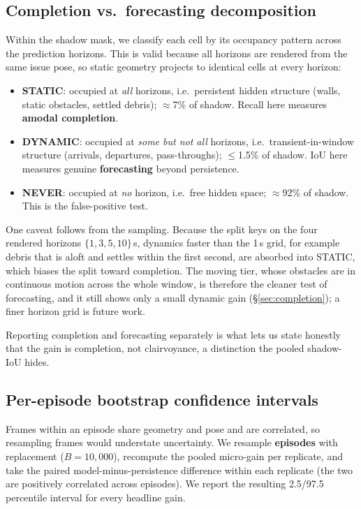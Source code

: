 \documentclass{article}
\begin{document}
\subsection{Completion vs.\ forecasting decomposition}
\label{sec:decomp}

Within the shadow mask, we classify each cell by its occupancy pattern across the prediction
horizons. This is valid because all horizons are rendered from the same issue pose, so static
geometry projects to identical cells at every horizon:

\begin{itemize}
\item \textbf{STATIC}: occupied at \emph{all} horizons, i.e.\ persistent hidden structure (walls, static obstacles,
  settled debris); $\approx$7\% of shadow. Recall here measures \textbf{amodal completion}.
\item \textbf{DYNAMIC}: occupied at \emph{some but not all} horizons, i.e.\ transient-in-window structure (arrivals,
  departures, pass-throughs); $\le$1.5\% of shadow. IoU here measures genuine \textbf{forecasting} beyond
  persistence.
\item \textbf{NEVER}: occupied at \emph{no} horizon, i.e.\ free hidden space; $\approx$92\% of shadow. This is the false-positive
  test.
\end{itemize}

One caveat follows from the sampling. Because the split keys on the four rendered horizons
$\{1, 3, 5, 10\}$\,s, dynamics faster than the 1\,s grid, for example debris that is aloft and
settles within the first second, are absorbed into STATIC, which biases the split toward
completion. The moving tier, whose obstacles are in continuous motion across the whole window, is
therefore the cleaner test of forecasting, and it still shows only a small dynamic gain
(\S\ref{sec:completion}); a finer horizon grid is future work.

Reporting completion and forecasting separately is what lets us state honestly that the gain is
completion, not clairvoyance, a distinction the pooled shadow-IoU hides.

\subsection{Per-episode bootstrap confidence intervals}
\label{sec:bootstrap}

Frames within an episode share geometry and pose and are correlated, so resampling frames would
understate uncertainty. We resample \textbf{episodes} with replacement ($B = 10{,}000$), recompute the
pooled micro-gain per replicate, and take the paired model-minus-persistence difference within each
replicate (the two are positively correlated across episodes). We report the resulting 2.5/97.5
percentile interval for every headline gain.
\end{document}
